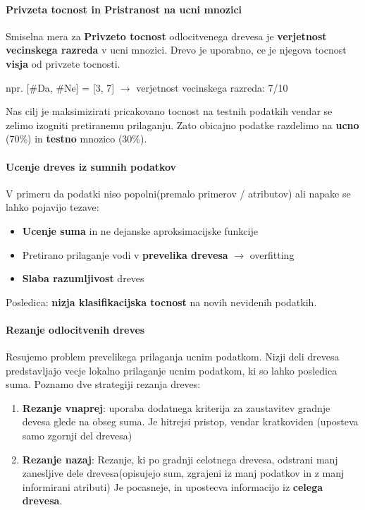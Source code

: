 \documentclass{article}
\begin{document}
\begin{multicols}{2}
\paragraph{Privzeta tocnost in Pristranost na ucni mnozici}

Smiselna mera za \textbf{Privzeto tocnost} odlocitvenega drevesa je \textbf{verjetnost vecinskega razreda} v
ucni mnozici. Drevo je uporabno, ce je njegova tocnost \textbf{visja} od privzete tocnosti.

npr. [\#Da, \#Ne] = [3, 7] $\rightarrow$ verjetnost vecinskega razreda: 7/10


Nas cilj je maksimizirati pricakovano tocnost na testnih podatkih vendar se zelimo izogniti pretiranemu prilaganju. Zato obicajno podatke
razdelimo na \textbf{ucno} (70\%) in \textbf{testno} mnozico (30\%).

\paragraph{Ucenje dreves iz sumnih podatkov}
V primeru da podatki niso popolni(premalo primerov / atributov) ali napake
se lahko pojavijo tezave:
\begin{itemize}
  \item \textbf{Ucenje suma} in ne dejanske aproksimacijske funkcije
  \item Pretirano prilaganje vodi v \textbf{prevelika drevesa} $\rightarrow$ overfitting
  \item \textbf{Slaba razumljivost} dreves
\end{itemize}
Posledica: \textbf{nizja klasifikacijska tocnost} na novih nevidenih podatkih.

 \paragraph{Rezanje odlocitvenih dreves}
 Resujemo problem prevelikega prilaganja ucnim podatkom.
 Nizji deli drevesa predstavljajo vecje lokalno prilaganje ucnim podatkom, ki so lahko posledica suma.
 Poznamo dve strategiji rezanja dreves:
 \begin{enumerate}
   \item \textbf{Rezanje vnaprej}: uporaba dodatnega kriterija za zaustavitev 
     gradnje devesa glede na obseg suma. Je hitrejsi pristop, vendar kratkoviden (uposteva samo zgornji del drevesa)
   \item \textbf{Rezanje nazaj}: Rezanje, ki po gradnji celotnega drevesa, odstrani manj zanesljive
     dele drevesa(opisujejo sum, zgrajeni iz manj podatkov in z manj informirani atributi)
     Je pocasneje, in upostecva informacijo iz \textbf{celega drevesa}.
 \end{enumerate}


\end{multicols}
\end{document}
